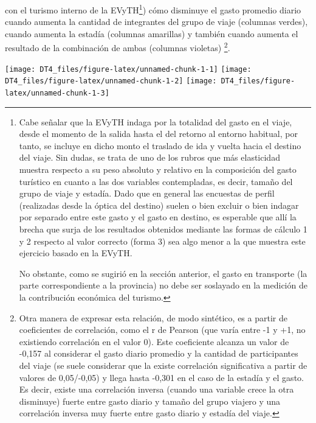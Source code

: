 \documentclass[
]{book}
\begin{document}
con el turismo interno de la EVyTH\footnote{Cabe señalar que la EVyTH indaga por la totalidad del gasto en el viaje, desde el momento de la salida hasta el del retorno al entorno habitual, por tanto, se incluye en dicho monto el traslado de ida y vuelta hacia el destino del viaje. Sin dudas, se trata de uno de los rubros que más elasticidad muestra respecto a su peso absoluto y relativo en la composición del gasto turístico en cuanto a las dos variables contempladas, es decir, tamaño del grupo de viaje y estadía. Dado que en general las encuestas de perfil (realizadas desde la óptica del destino) suelen o bien excluir o bien indagar por separado entre este gasto y el gasto en destino, es esperable que allí la brecha que surja de los resultados obtenidos mediante las formas de cálculo 1 y 2 respecto al valor correcto (forma 3) sea algo menor a la que muestra este ejercicio basado en la EVyTH.~

  No obstante, como se sugirió en la sección anterior, el gasto en transporte (la parte correspondiente a la provincia) no debe ser soslayado en la medición de la contribución económica del turismo.}) cómo disminuye el gasto promedio diario cuando aumenta la cantidad de integrantes del grupo de viaje (columnas verdes), cuando aumenta la estadía (columnas amarillas) y también cuando aumenta el resultado de la combinación de ambas (columnas violetas) \footnote{Otra manera de expresar esta relación, de modo sintético, es a partir de coeficientes de correlación, como el r de Pearson (que varía entre -1 y +1, no existiendo correlación en el valor 0). Este coeficiente alcanza un valor de -0,157 al considerar el gasto diario promedio y la cantidad de participantes del viaje (se suele considerar que la existe correlación significativa a partir de valores de 0,05/-0,05) y llega hasta -0,301 en el caso de la estadía y el gasto. Es decir, existe una correlación inversa (cuando una variable crece la otra disminuye) fuerte entre gasto diario y tamaño del grupo viajero y una correlación inversa muy fuerte entre gasto diario y estadía del viaje.}.

\texttt{[image: DT4\_files/figure-latex/unnamed-chunk-1-1]}
\texttt{[image: DT4\_files/figure-latex/unnamed-chunk-1-2]}
\texttt{[image: DT4\_files/figure-latex/unnamed-chunk-1-3]}
\end{document}
